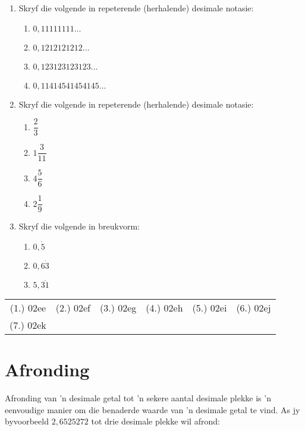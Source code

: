 \begin{exercises}{}
{\begin{enumerate}[itemsep=5pt, label=\textbf{\arabic*}. ]
\item Skryf die volgende in repeterende (herhalende) desimale notasie:
\begin{enumerate}[itemsep=5pt, label=\textbf{(\alph*)} ] 
    \item $0,11111111\ldots$
    \item $0,1212121212\ldots$
    \item $0,123123123123\ldots$
    \item $0,11414541454145\ldots$
    \end{enumerate}
\item Skryf die volgende in repeterende (herhalende) desimale notasie:
\begin{enumerate}[itemsep=5pt, label=\textbf{(\alph*)} ] 
    \item $\dfrac{2}{3}$
    \item $1\dfrac{3}{11}$
    \item $4\dfrac{5}{6}$
    \item $2\dfrac{1}{9}$
    \end{enumerate}
\item Skryf die volgende in breukvorm:
\begin{enumerate}[itemsep=5pt, label=\textbf{(\alph*)} ] 
    \item $0,\dot{5}$
    \item $0,6\dot{3}$
    \item $5,\overline{31}$
    \end{enumerate}
\end{enumerate}

\par \practiceinfo
\par \begin{tabular}[h]{cccccc}
(1.)	02ee	&
(2.)	02ef	&
(3.)	02eg	&
(4.)	02eh	&
(5.)	02ei	&
(6.)	02ej	\\ %
(7.)	02ek	&
\end{tabular}
}
\end{exercises}

\section{Afronding}

Afronding van ’n desimale getal tot ’n sekere aantal desimale plekke is ’n eenvoudige manier om die benaderde waarde van ’n desimale getal te vind. As jy byvoorbeeld $2,6525272$  tot drie desimale plekke wil afrond:


